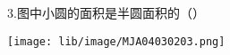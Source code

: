 3.图中小圆的面积是半圆面积的\hfill （\quad）


\begin{center}

    \texttt{[image: lib/image/MJA04030203.png]}

\end{center}



